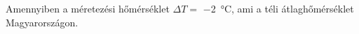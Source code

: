 Amennyiben a méretezési hőmérséklet $\Delta T=$ \SI{-2}{\celsius}, ami a téli átlaghőmérséklet Magyarországon.








%
%
%


